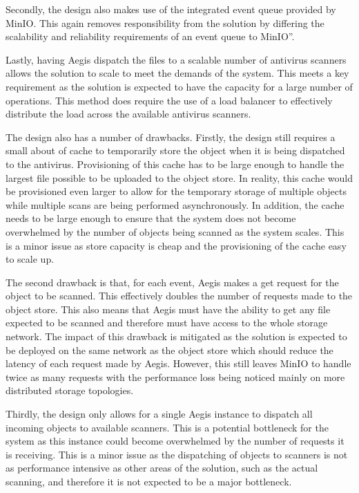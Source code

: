 \documentclass[12pt, conference, final, a4paper, onecolumn, compsoc]{IEEEtran}
\begin{document}
    Secondly, the design also makes use of the integrated event queue provided
    by MinIO. This again removes responsibility from the solution by differing the
    scalability and reliability requirements of an event queue to MinIO''.


    Lastly, having Aegis dispatch the files to a scalable number of antivirus
    scanners allows the solution to scale to meet the demands of the system.
    This meets a key requirement as the solution is expected to have the
    capacity for a large number of operations. This method does require the use
    of a load balancer to effectively distribute the load across the available
    antivirus scanners.

    The design also has a number of drawbacks. Firstly, the design still
    requires a small about of cache to temporarily store the object when it is
    being dispatched to the antivirus. Provisioning of this cache has to be
    large enough to handle the largest file possible to be uploaded to the
    object store. In reality, this cache would be provisioned even larger to
    allow for the temporary storage of multiple objects while multiple scans are
    being performed asynchronously. In addition, the cache needs to be large
    enough to ensure that the system does not become overwhelmed by the number
    of objects being scanned as the system scales. This is a minor issue as
    store capacity is cheap and the provisioning of the cache easy to scale up.


    The second drawback is that, for each event, Aegis makes a get request for the
    object to be scanned. This effectively doubles the number of requests made
    to the object store. This also means that Aegis must have the ability to get
    any file expected to be scanned and therefore must have access to the whole
    storage network. The impact of this drawback is mitigated as the solution is expected to be
    deployed on the same network as the object store which should reduce the
    latency of each request made by Aegis. However, this still leaves MinIO to
    handle twice as many requests with the performance loss being noticed mainly
    on more distributed storage topologies.

    Thirdly, the design only allows for a single Aegis instance to dispatch all
    incoming objects to available scanners. This is a potential bottleneck for
    the system as this instance could become overwhelmed by the number of
    requests it is receiving. This is a minor issue as the dispatching of
    objects to scanners is not as performance intensive as other areas of the
    solution, such as the actual scanning, and therefore it is not expected to
    be a major bottleneck.
\end{document}

